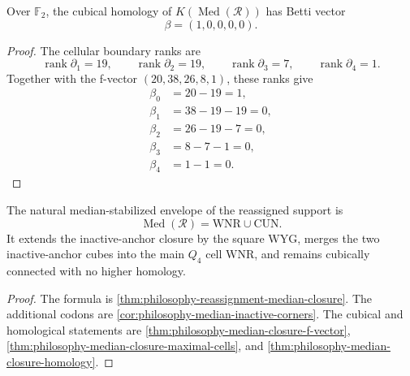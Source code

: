 \begin{theorem}
\label{thm:philosophy-median-closure-homology}
Over $\mathbb{F}_{2}$, the cubical homology of
$K(\operatorname{Med}(\mathcal{R}))$ has Betti vector
$$
  \beta=(1,0,0,0,0).
$$
\end{theorem}
\begin{proof}
The cellular boundary ranks are
$$
  \operatorname{rank}\partial_{1}=19,\qquad
  \operatorname{rank}\partial_{2}=19,\qquad
  \operatorname{rank}\partial_{3}=7,\qquad
  \operatorname{rank}\partial_{4}=1.
$$
Together with the f-vector
$(20,38,26,8,1)$, these ranks give
$$
\begin{aligned}
  \beta_{0}&=20-19=1,\\
  \beta_{1}&=38-19-19=0,\\
  \beta_{2}&=26-19-7=0,\\
  \beta_{3}&=8-7-1=0,\\
  \beta_{4}&=1-1=0.
\end{aligned}
$$
\end{proof}

\begin{theorem}
\label{thm:philosophy-median-closure-structure}
The natural median-stabilized envelope of the reassigned support is
$$
  \operatorname{Med}(\mathcal{R})=\mathrm{WNR}\cup\mathrm{CUN}.
$$
It extends the inactive-anchor closure by the square
$\mathrm{WYG}$, merges the two inactive-anchor cubes into the main
$Q_{4}$ cell $\mathrm{WNR}$, and remains cubically connected with no
higher homology.
\end{theorem}
\begin{proof}
The formula is \autoref{thm:philosophy-reassignment-median-closure}.
The additional codons are
\autoref{cor:philosophy-median-inactive-corners}. The cubical and
homological statements are
\autoref{thm:philosophy-median-closure-f-vector},
\autoref{thm:philosophy-median-closure-maximal-cells}, and
\autoref{thm:philosophy-median-closure-homology}.
\end{proof}
